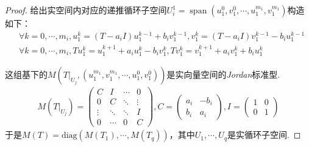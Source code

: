 \begin{proof}
    给出实空间内对应的递推循环子空间\(U_i^1=\operatorname{span}(u_1^0,v_1^0,\cdots,u_1^{m_1},v_1^{m_1})\)构造如下：
    \begin{align*}
        &\forall k=0,\cdots,m_i,u_1^k=(T-a_iI)u_1^{k-1}+b_i v_1^{k-1},v_1^k=(T-a_iI)v_1^{k-1}-b_i u_1^{k-1} \\
        &\forall k=0,\cdots,m_i,Tu_1^k=u_1^{k+1}+a_i u_1^k-b_i v_1^k,Tv_1^k=v_1^{k+1}+a_i v_1^k+b_i u_1^k
    \end{align*}
        \begin{comment}
            \(u^k,v^k\)的显式构造如下：
            \begin{align*}
                &u_k=\sum_{j=0}^k C_k^j (-b)^{k-j} (T-aI)^j u_0+\sum_{j=0}^k C_{k-1}^j (-b)^{k-j-1} (T-aI)^j v_0 \\
                &v_k=\sum_{j=0}^k C_k^j (-b)^{k-j} (T-aI)^j v_0-\sum_{j=0}^k C_{k-1}^j (-b)^{k-j-1} (T-aI)^j u_0
            \end{align*}
            因此若存在\(p<m_1+1\)使得\((T-a_iI)^p u_1^0=0\)或\((T-a_iI)^p v_1^0=0\)，那么
            \begin{align*}
                u_1^p/v_1^p \in \operatorname{span}(u_1^{p-1},v_1^{p-1},\cdots,u_1^0,v_1^0)
            \end{align*}
            从而导致递推链出现冗余，因此\(u,v,(u,v)\)的幂零指数严格相等.
        \end{comment}
    这组基下的\(M(T|_{U_j},(u_1^{m_1},v_1^{m_1},\cdots,u_1^0,v_1^0))\)是实向量空间的\textit{Jordan}标准型.
    \begin{align*}
        M(T|_{U_j})=
        \begin{pmatrix}
            C      & I       & \cdots & 0      \\
            0      & C       & \ddots & \vdots \\
            \vdots & \ddots  & \ddots & I      \\
            0      & \cdots  & 0      & C
        \end{pmatrix}
        ,C=
        \begin{pmatrix}
            a_i & -b_i \\
            b_i & a_i
        \end{pmatrix}
        ,I=
        \begin{pmatrix}
            1 & 0 \\
            0 & 1
        \end{pmatrix}
    \end{align*}
    于是\(M(T)=\mathrm{diag}(M(T_1),\cdots,M(T_q))\)，其中\(U_1,\cdots,U_q\)是实循环子空间.
\end{proof}


